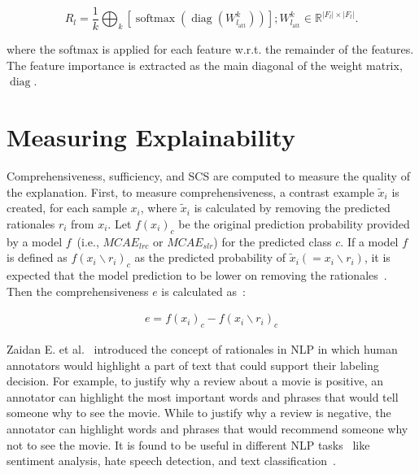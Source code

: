 \begin{equation}
    R_{l}=\frac{1}{k} \bigoplus_{k}\left[\operatorname{softmax}\left(\operatorname{diag}\left(W_{l_{\mathrm{att}}}^{k}\right)\right)\right] ; W_{l_{\mathrm{att}}}^{k} \in \mathbb{R}^{|F_l| \times|F_l|}.
\end{equation}

\hspace*{3.5mm} where the softmax is applied for each feature w.r.t. the remainder of the features. The feature importance is extracted as the main diagonal of the weight matrix, $\operatorname{diag}$. 


\section{Measuring Explainability}
Comprehensiveness, sufficiency, and SCS are computed to measure the quality of the explanation. First, to measure comprehensiveness, a contrast example $\tilde{x}_{i}$ is created, for each sample $x_{i}$, where $\tilde{x}_{i}$ is calculated by removing the predicted rationales $r_{i}$ from $x_{i}$. Let $f\left(x_{i}\right)_{c}$ be the original prediction probability provided by a model $f$~(i.e., $MCAE_{lrc}$ or $MCAE_{slr}$) for the predicted class $c$. If a model $f$ is defined as $f\left(x_{i} \backslash r_{i}\right)_{c}$ as the predicted probability of $\tilde{x}_{i}\left(=x_{i} \backslash r_{i}\right)$, it is expected that the model prediction to be lower on removing the rationales~\cite{deyoung2019eraser}. Then the comprehensiveness $e$ is calculated as~\cite{deyoung2019eraser}: 

\begin{align}
    e  = f\left(x_{i}\right)_{c}-f\left(x_{i} \backslash r_{i}\right)_{c}
\end{align}

\hspace*{3.5mm} Zaidan E. et al.~\cite{zaidan2007using} introduced the concept of rationales in NLP in which human annotators would highlight a part of text that could support their labeling decision. For example, to justify why a review about a movie is positive, an annotator can highlight the most important words and phrases that would tell someone why to see the movie. While to justify why a review is negative, the annotator can highlight words and phrases that would recommend someone why not to see the movie. It is found to be useful in different NLP tasks~\cite{deyoung2019eraser} like sentiment analysis, hate speech detection, and text classification~\cite{herrewijnenmachine}. 

